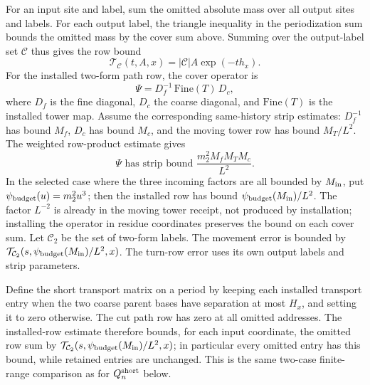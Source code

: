For an input site and label, sum the omitted absolute mass over all
output sites and labels. For each output label, the triangle inequality
in the periodization sum bounds the omitted mass by the cover sum above.
Summing over the output-label set $\mathcal C$ thus gives the row bound
\[
 \mathcal T_{\mathcal C}(t,A,x)=|\mathcal C|A\exp(-t h_x).
\]
For the installed two-form path row, the cover operator is
\[
 \Psi=D_f^{-1}\,\mathrm{Fine}(T)\,D_c,
\]
where $D_f$ is the fine diagonal, $D_c$ the coarse diagonal, and
$\mathrm{Fine}(T)$ is the installed tower map. Assume the corresponding
same-history strip estimates: $D_f^{-1}$ has bound $M_f$, $D_c$ has bound
$M_c$, and the moving tower row has bound $M_T/L^2$. The weighted
row-product estimate gives
\[
 \Psi\text{ has strip bound }
 \frac{m_2^2 M_fM_T M_c}{L^2}.
\]
In the selected case where the three incoming factors are all bounded by
$M_{\rm in}$, put $\psi_{\rm budget}(u)=m_2^2u^3$; then the installed row
has bound $\psi_{\rm budget}(M_{\rm in})/L^2$. The factor $L^{-2}$ is
already in the moving tower receipt, not produced by installation;
installing the operator in residue coordinates preserves the bound on
each cover sum. Let $\mathcal C_2$ be the set of two-form labels. The
movement error is bounded by
$\mathcal T_{\mathcal C_2}(s,\psi_{\rm budget}(M_{\rm in})/L^2,x)$.
The turn-row error uses its own output labels and strip parameters.

Define the short transport matrix on a period by keeping each installed
transport entry when the two coarse parent bases have separation at most
$H_x$, and setting it to zero otherwise. The cut path row has zero at all
omitted addresses. The installed-row estimate therefore bounds, for each
input coordinate, the omitted row sum by
$\mathcal T_{\mathcal C_2}(s,\psi_{\rm budget}(M_{\rm in})/L^2,x)$; in
particular every omitted entry has this bound, while retained entries are
unchanged. This is the same two-case finite-range comparison as for
$Q_n^{\rm short}$ below.

